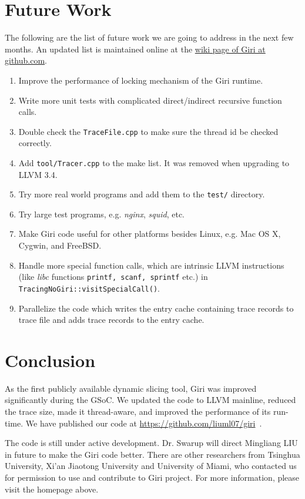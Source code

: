 \documentclass[DIV=calc, paper=a4, fontsize=11pt, twocolumn]{scrartcl}
\begin{document}
\section{Future Work}
The following are the list of future work we are going to address in the next few months.
An updated list is maintained online at the \href{https://github.com/liuml07/giri/wiki/TODO}{wiki page of Giri at github.com}.
\label{sec:todo}
\begin{enumerate}
	\item Improve the performance of locking mechanism of the Giri runtime.
	\item Write more unit tests with complicated direct/indirect recursive function calls.
	\item Double check the \texttt{TraceFile.cpp} to make sure the thread id be checked correctly.
	\item Add \texttt{tool/Tracer.cpp} to the make list. It was removed when upgrading to LLVM 3.4.
	\item Try more real world programs and add them to the \texttt{test/} directory.
	\item Try large test programs, e.g. \emph{nginx}, \emph{squid}, etc.
	\item Make Giri code useful for other platforms besides Linux, e.g. Mac OS X, Cygwin, and FreeBSD.
	\item Handle more special function calls, which are intrinsic LLVM instructions (like \emph{libc} functions \texttt{printf, scanf, sprintf} etc.) in \texttt{TracingNoGiri::visitSpecialCall()}.
	\item Parallelize the code which writes the entry cache containing trace records to trace file and adds trace records to the entry cache.
\end{enumerate}

\section{Conclusion}
\label{sec:contact}
As the first publicly available dynamic slicing tool,
Giri was improved significantly during the GSoC.
We updated the code to LLVM mainline, reduced the trace size, made it thread-aware, and improved the performance of its run-time.
We have published our code at \href{https://github.com/liuml07/giri}{https://github.com/liuml07/giri}~\cite{giri}.

The code is still under active development.
Dr. Swarup will direct Mingliang LIU in future to make the Giri code better.
There are other researchers from Tsinghua University, Xi'an Jiaotong University and University of Miami,
who contacted us for permission to use and contribute to Giri project.
For more information, please visit the homepage above.


 
\end{document}

